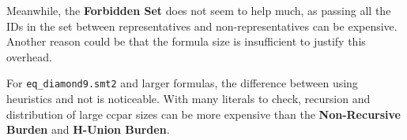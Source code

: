 \documentclass[11pt,a4paper]{article}
\begin{document}
    Meanwhile, the \textbf{Forbidden Set} does not seem to help much, as passing all the IDs in the set between representatives and non-representatives can be expensive. Another reason could be that the formula size is insufficient to justify this overhead.

    For \texttt{eq\_diamond9.smt2} and larger formulas, the difference between using heuristics and not is noticeable. With many literals to check, recursion and distribution of large ccpar sizes can be more expensive than the \textbf{Non-Recursive Burden} and \textbf{H-Union Burden}.


    
        
\end{document}
